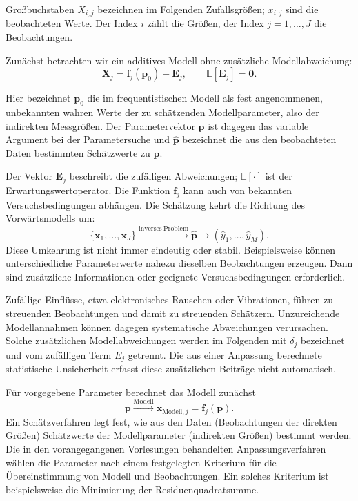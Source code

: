 Großbuchstaben $X_{i,j}$ bezeichnen im Folgenden Zufallsgrößen;
$x_{i,j}$ sind die beobachteten Werte. Der Index $i$ zählt
die Größen, der Index $j=1,\dots,J$ die Beobachtungen.

Zunächst betrachten wir ein additives Modell ohne zusätzliche
Modellabweichung:
\begin{equation}
\mathbf{X}_j=\mathbf{f}_j(\mathbf{p}_0)+\mathbf{E}_j,
\qquad \mathbb{E}[\mathbf{E}_j]=\mathbf{0}.
\label{KonzepteAdditivesModell}
\end{equation}

Hier bezeichnet $\mathbf p_0$ die im frequentistischen Modell als
fest angenommenen, unbekannten wahren Werte der zu schätzenden
Modellparameter, also der indirekten Messgrößen.
Der Parametervektor $\mathbf p$ ist dagegen das variable Argument bei der Parametersuche und $\widehat{\mathbf p}$ bezeichnet die
aus den beobachteten Daten bestimmten Schätzwerte zu $\mathbf p$.

Der Vektor $\mathbf{E}_j$ beschreibt die zufälligen
Abweichungen; $\mathbb{E}[\cdot]$ ist der Erwartungswertoperator.
Die Funktion $\mathbf{f}_j$ kann auch von bekannten
Versuchsbedingungen abhängen. Die Schätzung kehrt die Richtung des
Vorwärtsmodells um:
\begin{equation}
\{\mathbf{x}_1,\dots,\mathbf{x}_J\}
\xrightarrow{\mathrm{inverses\ Problem}}
\widehat{\mathbf{p}}
\longrightarrow (\widehat{y}_1,\dots,\widehat{y}_M).
\label{inverseProblemEq}
\end{equation}
Diese Umkehrung ist nicht immer eindeutig oder stabil. Beispielsweise
können unterschiedliche Parameterwerte nahezu dieselben Beobachtungen
erzeugen. Dann sind zusätzliche Informationen oder geeignete
Versuchsbedingungen erforderlich.

Zufällige Einflüsse, etwa elektronisches Rauschen oder Vibrationen,
führen zu streuenden Beobachtungen und damit zu streuenden Schätzern.
Unzureichende Modellannahmen können dagegen systematische Abweichungen
verursachen. Solche zusätzlichen Modellabweichungen werden im Folgenden
mit $\delta_j$ bezeichnet und vom zufälligen Term $E_j$ getrennt.
Die aus einer Anpassung berechnete statistische Unsicherheit erfasst
diese zusätzlichen Beiträge nicht automatisch.

Für vorgegebene Parameter berechnet das Modell zunächst
\begin{equation}
\mathbf{p}\xrightarrow{\mathrm{Modell}}
\mathbf{x}_{\mathrm{Modell},j}=\mathbf{f}_j(\mathbf{p}).
\label{forwardModel2}
\end{equation}
Ein Schätzverfahren legt fest, wie aus den Daten (Beobachtungen der direkten Größen) Schätzwerte der Modellparameter (indirekten Größen)
bestimmt werden. Die in den vorangegangenen Vorlesungen behandelten
Anpassungsverfahren wählen die Parameter nach einem festgelegten
Kriterium für die Übereinstimmung von Modell und Beobachtungen. Ein solches Kriterium ist beispielsweise die Minimierung der Residuenquadratsumme.

